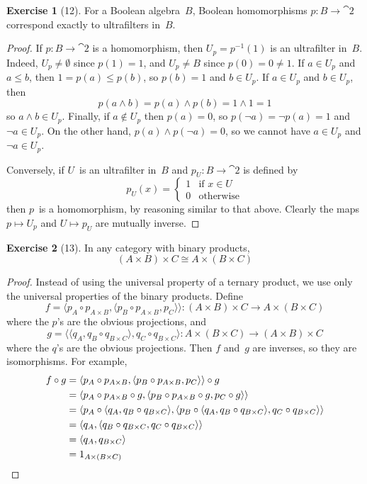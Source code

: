 \documentclass[letterpaper,12pt]{article}
\newcommand{\iso}{\cong}
\newcommand{\meet}{\wedge}
\newcommand{\compl}{\lnot}
\newcommand{\after}{\circ}
\newcommand{\pair}[2]{\langle{#1},{#2}\rangle}
\newcommand{\inv}[1]{#1^{-1}}
\newcommand{\2}{\cat{2}}
\theoremstyle{definition}
\newtheorem*{exer}{Exercise}
\theoremstyle{remark}
\theoremstyle{direction}
\begin{document}
\begin{exer}[12]
For a Boolean algebra~\(B\), Boolean homomorphisms \(p:B\to\2\) correspond exactly to ultrafilters in~\(B\).
\end{exer}
\begin{proof}
If \(p:B\to\2\) is a homomorphism, then \(U_p=\inv{p}(1)\) is an ultrafilter in~\(B\). Indeed, \(U_p\ne\emptyset\) since \(p(1)=1\), and \(U_p\ne B\) since \(p(0)=0\ne 1\). If \(a\in U_p\) and \(a\le b\), then \(1=p(a)\le p(b)\), so \(p(b)=1\) and \(b\in U_p\). If \(a\in U_p\) and \(b\in U_p\), then
\[p(a\meet b)=p(a)\meet p(b)=1\meet 1=1\]
so \(a\meet b\in U_p\). Finally, if \(a\not\in U_p\) then \(p(a)=0\), so \(p(\compl a)=\compl p(a)=1\) and \(\compl a\in U_p\). On the other hand, \(p(a)\meet p(\compl a)=0\), so we cannot have \(a\in U_p\) and \(\compl a\in U_p\).

Conversely, if \(U\)~is an ultrafilter in~\(B\) and \(p_U:B\to\2\) is defined by
\[
p_U(x)=\begin{cases}
1&\text{if }x\in U\\
0&\text{otherwise}
\end{cases}
\]
then \(p\)~is a homomorphism, by reasoning similar to that above. Clearly the maps \(p\mapsto U_p\) and \(U\mapsto p_U\) are mutually inverse.
\end{proof}

\begin{exer}[13]
In any category with binary products,
\[(A\times B)\times C\iso A\times (B\times C)\]
\end{exer}
\begin{proof}
Instead of using the universal property of a ternary product, we use only the universal properties of the binary products. Define
\[f=\pair{p_A\after p_{A\times B}}{\pair{p_B\after p_{A\times B}}{p_C}}:(A\times B)\times C\to A\times(B\times C)\]
where the \(p\)'s are the obvious projections, and
\[g=\pair{\pair{q_A}{q_B\after q_{B\times C}}}{q_C\after q_{B\times C}}:A\times(B\times C)\to(A\times B)\times C\]
where the \(q\)'s are the obvious projections. Then \(f\) and~\(g\) are inverses, so they are isomorphisms. For example,
\begin{align*}
f\after g&=\pair{p_A\after p_{A\times B}}{\pair{p_B\after p_{A\times B}}{p_C}}\after g\\
	&=\pair{p_A\after p_{A\times B}\after g}{\pair{p_B\after p_{A\times B}\after g}{p_C\after g}}\\
	&=\pair{p_A\after \pair{q_A}{q_B\after q_{B\times C}}}{\pair{p_B\after \pair{q_A}{q_B\after q_{B\times C}}}{q_C\after q_{B\times C}}}\\
	&=\pair{q_A}{\pair{q_B\after q_{B\times C}}{q_C\after q_{B\times C}}}\\
	&=\pair{q_A}{q_{B\times C}}\\
	&=1_{A\times(B\times C)}\qedhere
\end{align*}
\end{proof}
\end{document}
